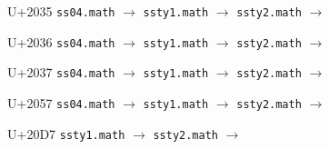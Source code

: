 \documentclass{article}
\begin{document}
\begin{substitutions}
\goodbreak

U+2035  \linebreak
    \texttt{ss04.math} $\to$  \linebreak
    \texttt{ssty1.math} $\to$  \linebreak
    \texttt{ssty2.math} $\to$  

\goodbreak

U+2036  \linebreak
    \texttt{ss04.math} $\to$  \linebreak
    \texttt{ssty1.math} $\to$  \linebreak
    \texttt{ssty2.math} $\to$  

\goodbreak

U+2037  \linebreak
    \texttt{ss04.math} $\to$  \linebreak
    \texttt{ssty1.math} $\to$  \linebreak
    \texttt{ssty2.math} $\to$  

\goodbreak

U+2057  \linebreak
    \texttt{ss04.math} $\to$  \linebreak
    \texttt{ssty1.math} $\to$  \linebreak
    \texttt{ssty2.math} $\to$  

\goodbreak

\end{substitutions}

\clearpage

\begin{substitutions}

U+20D7  \linebreak
    \texttt{ssty1.math} $\to$  \linebreak
    \texttt{ssty2.math} $\to$  

\goodbreak

\end{substitutions}

\clearpage
\end{document}
